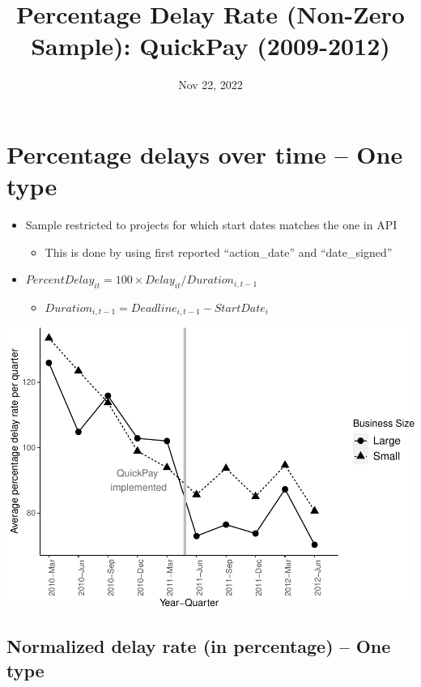 \documentclass[
]{article}
\title{Percentage Delay Rate (Non-Zero Sample): QuickPay (2009-2012)}
\author{}
\date{\vspace{-2.5em}Nov 22, 2022}
\providecommand{\tightlist}{%
  \setlength{\itemsep}{0pt}\setlength{\parskip}{0pt}}
\begin{document}
\maketitle

\hypertarget{percentage-delays-over-time-one-type}{%
\section{Percentage delays over time -- One
type}\label{percentage-delays-over-time-one-type}}

\begin{itemize}
\tightlist
\item
  Sample restricted to projects for which start dates matches the one in
  API

  \begin{itemize}
  \tightlist
  \item
    This is done by using first reported ``action\_date'' and
    ``date\_signed''
  \end{itemize}
\item
  \(PercentDelay_{it}=100 \times Delay_{it}/Duration_{i,t-1}\)

  \begin{itemize}
  \tightlist
  \item
    \(Duration_{i,t-1} = Deadline_{i,t-1} - StartDate_i\)
  \end{itemize}
\end{itemize}

\includegraphics{qp_first_pc_delay_non_zero_files/figure-latex/plot_pc_delay-1.pdf}

\hypertarget{normalized-delay-rate-in-percentage-one-type}{%
\subsection{Normalized delay rate (in percentage) -- One
type}\label{normalized-delay-rate-in-percentage-one-type}}
\end{document}
